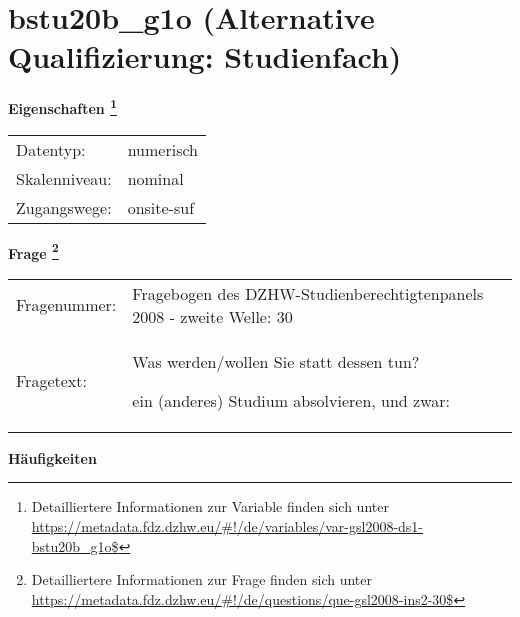 
    \setcounter{footnote}{0}

    \vspace*{-1.8cm}
	\section{bstu20b\_g1o (Alternative Qualifizierung: Studienfach)}
	\label{section:bstu20b_g1o}



    \vspace*{0.5cm}
    \noindent\textbf{Eigenschaften
	\footnote{Detailliertere Informationen zur Variable finden sich unter
		\url{https://metadata.fdz.dzhw.eu/\#!/de/variables/var-gsl2008-ds1-bstu20b_g1o$}}}\\
	\begin{tabularx}{\hsize}{@{}lX}
	Datentyp: & numerisch \\
	Skalenniveau: & nominal \\
	Zugangswege: &
	  onsite-suf
 \\
    \end{tabularx}



				\vspace*{0.5cm}
                \noindent\textbf{Frage
	                \footnote{Detailliertere Informationen zur Frage finden sich unter
		              \url{https://metadata.fdz.dzhw.eu/\#!/de/questions/que-gsl2008-ins2-30$}}}\\
				\begin{tabularx}{\hsize}{@{}lX}
					Fragenummer: &
					  Fragebogen des DZHW-Studienberechtigtenpanels 2008 - zweite Welle:
					  30
 \\
					Fragetext: & Was werden/wollen Sie statt dessen tun?\par  ein (anderes) Studium absolvieren, und zwar: \\
				\end{tabularx}





        		\vspace*{0.5cm}
                \noindent\textbf{Häufigkeiten}

